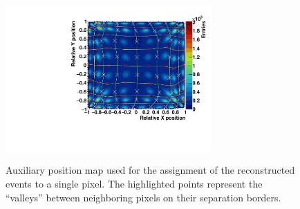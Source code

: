 \begin{figure} [!h]
\centering
\includegraphics[width=0.7\textwidth]{03_GraphicFiles/chapter3_CLaRySproto/Absorber/images_charResults_Co60/3_Cal_FLOODMAP_averPoints.pdf}\\
\caption{Auxiliary position map used for the assignment of the reconstructed events to a single pixel. The highlighted points represent the \enquote{valleys} between neighboring pixels on their separation borders.}
\label{chap3::fig::absavPosMap}
\end{figure}

